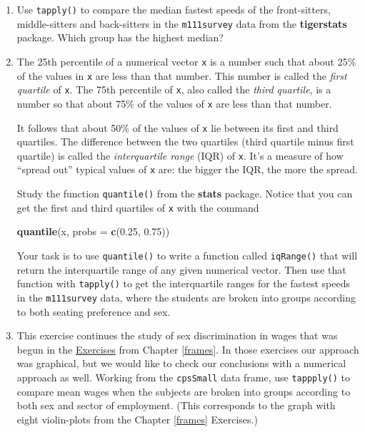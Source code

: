 \documentclass[]{book}
\makeatletter
\newenvironment{Shaded}{\begin{snugshade}}{\end{snugshade}}
\newcommand{\KeywordTok}[1]{\textcolor[rgb]{0.13,0.29,0.53}{\textbf{#1}}}
\newcommand{\DataTypeTok}[1]{\textcolor[rgb]{0.13,0.29,0.53}{#1}}
\newcommand{\FloatTok}[1]{\textcolor[rgb]{0.00,0.00,0.81}{#1}}
\newcommand{\NormalTok}[1]{#1}
\newenvironment{kframe}{%
\medskip{}
\setlength{\fboxsep}{.8em}
 \def\at@end@of@kframe{}%
 \ifinner\ifhmode%
  \def\at@end@of@kframe{\end{minipage}}%
  \begin{minipage}{\columnwidth}%
 \fi\fi%
 \def\FrameCommand##1{\hskip\@totalleftmargin \hskip-\fboxsep
 \colorbox{shadecolor}{##1}\hskip-\fboxsep
     \hskip-\linewidth \hskip-\@totalleftmargin \hskip\columnwidth}%
 \MakeFramed {\advance\hsize-\width
   \@totalleftmargin\z@ \linewidth\hsize
   \@setminipage}}%
 {\par\unskip\endMakeFramed%
 \at@end@of@kframe}
\renewenvironment{Shaded}{\begin{kframe}}{\end{kframe}}
\theoremstyle{definition}
\theoremstyle{definition}
\theoremstyle{definition}
\theoremstyle{remark}
\makeatother
\begin{document}
{\begin{enumerate}
\def\labelenumi{\arabic{enumi}.}
\item
  Use \texttt{tapply()} to compare the median fastest speeds of the
  front-sitters, middle-sitters and back-sitters in the
  \texttt{m111survey} data from the \textbf{tigerstats} package. Which
  group has the highest median?
\item
  The 25th percentile of a numerical vector \texttt{x} is a number such
  that about 25\% of the values in \texttt{x} are less than that number.
  This number is called the \emph{first quartile} of \texttt{x}. The
  75th percentile of \texttt{x}, also called the \emph{third quartile},
  is a number so that about 75\% of the values of \texttt{x} are less
  than that number.

  It follows that about 50\% of the values of \texttt{x} lie between its
  first and third quartiles. The difference between the two quartiles
  (third quartile minus first quartile) is called the
  \emph{interquartile range} (IQR) of \texttt{x}. It's a measure of how
  ``spread out'' typical values of \texttt{x} are: the bigger the IQR,
  the more the spread.

  Study the function \texttt{quantile()}
  from the
  \textbf{stats} package. Notice that you can get the first and third
  quartiles of \texttt{x} with the command

\begin{Shaded}
\begin{Highlighting}[]
\KeywordTok{quantile}\NormalTok{(x, }\DataTypeTok{probs =} \KeywordTok{c}\NormalTok{(}\FloatTok{0.25}\NormalTok{, }\FloatTok{0.75}\NormalTok{))}
\end{Highlighting}
\end{Shaded}

  Your task is to use \texttt{quantile()} to write a function called
  \texttt{iqRange()} that will return the interquartile range of any
  given numerical vector. Then use that function with \texttt{tapply()}
  to get the interquartile ranges for the fastest speeds in the
  \texttt{m111survey} data, where the students are broken into groups
  according to both seating preference and sex.
\item
  This exercise continues the study of sex discrimination in wages that
  was begun in the \protect\hyperlink{frames-exercises}{Exercises} from
  Chapter \ref{frames}. In those exercises our approach was graphical,
  but we would like to check our conclusions with a numerical approach
  as well. Working from the \texttt{cpsSmall} data frame, use
  \texttt{tappply()} to compare mean wages when the subjects are broken
  into groups according to both sex and sector of employment. (This
  corresponds to the graph with eight violin-plots from the Chapter
  \ref{frames} Exercises.)


\end{enumerate}}
\end{document}
